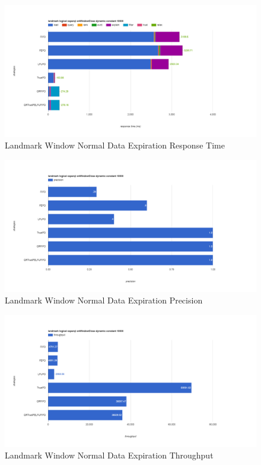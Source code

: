 \begin{figure}[!htbp]
	\centering
    \includegraphics[width=6.5in]{img/app3-land-normal-r.png}
    \caption{Landmark Window Normal Data Expiration Response Time}
\end{figure}
\begin{figure}[!htbp]
	\centering
    \includegraphics[width=6.5in]{img/app3-land-normal-p.png}
    \caption{Landmark Window Normal Data Expiration Precision}
\end{figure}
\begin{figure}[!htbp]
	\centering
    \includegraphics[width=6.5in]{img/app3-land-normal-t.png}
    \caption{Landmark Window Normal Data Expiration Throughput}
\end{figure}
